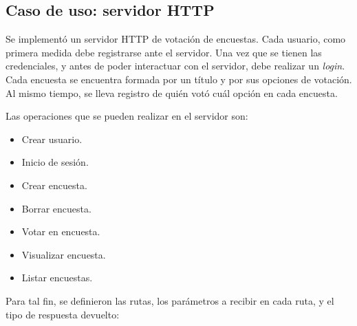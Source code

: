 \documentclass[11pt]{article}
\let\Oldsubsection\subsection
\renewcommand{\subsection}{\FloatBarrier\Oldsubsection}
\newcommand{\english}[1]{\textit{#1}}
\begin{document}
\subsection{Caso de uso: servidor HTTP}

Se implementó un servidor HTTP de votación de encuestas. Cada usuario, como primera medida debe registrarse ante el servidor. Una vez que se tienen las credenciales, y antes de poder interactuar con el servidor,  debe realizar un \english{login}. Cada encuesta se encuentra formada por un título y por sus opciones de votación. Al mismo tiempo, se lleva registro de quién votó cuál opción en cada encuesta.

Las operaciones que se pueden realizar en el servidor son:

\begin{itemize}
    \item Crear usuario.
    \item Inicio de sesión.
    \item Crear encuesta.
    \item Borrar encuesta.
    \item Votar en encuesta.
    \item Visualizar encuesta.
    \item Listar encuestas.
\end{itemize}

Para tal fin, se definieron las rutas, los parámetros a recibir en cada ruta, y el tipo de respuesta devuelto:
\end{document}
